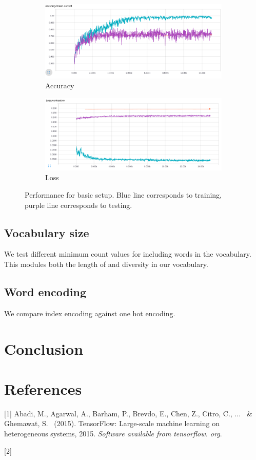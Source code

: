 \documentclass{article}
\begin{document}
\begin{figure}[H]
  \centering
  \begin{subfigure}{\textwidth}
  	\centering
  	\includegraphics[width=0.75\linewidth]{./images/accuracy.png}
  	\caption{Accuracy}
  \end{subfigure}
  \begin{subfigure}{\textwidth}
  	\centering
  	\includegraphics[width=0.75\linewidth]{./images/loss.png}
  	\caption{Loss}
  \end{subfigure}
  \caption{Performance for basic setup. Blue line corresponds to training, purple line corresponds to testing.}
  	\label{fig:performance}
\end{figure}

\subsection{Vocabulary size}
We test different minimum count values for including words in the vocabulary. This modules both the length of and diversity in our vocabulary.

\subsection{Word encoding}
We compare index encoding against one hot encoding.

\section{Conclusion}


\section*{References}

\small

[1] Abadi, M., Agarwal, A., Barham, P., Brevdo, E., Chen, Z., Citro, C., ... \ \& Ghemawat, S. \ (2015). TensorFlow: Large-scale machine learning on heterogeneous systems, 2015. {\it Software available from tensorflow. org}.

[2] 



\end{document}
